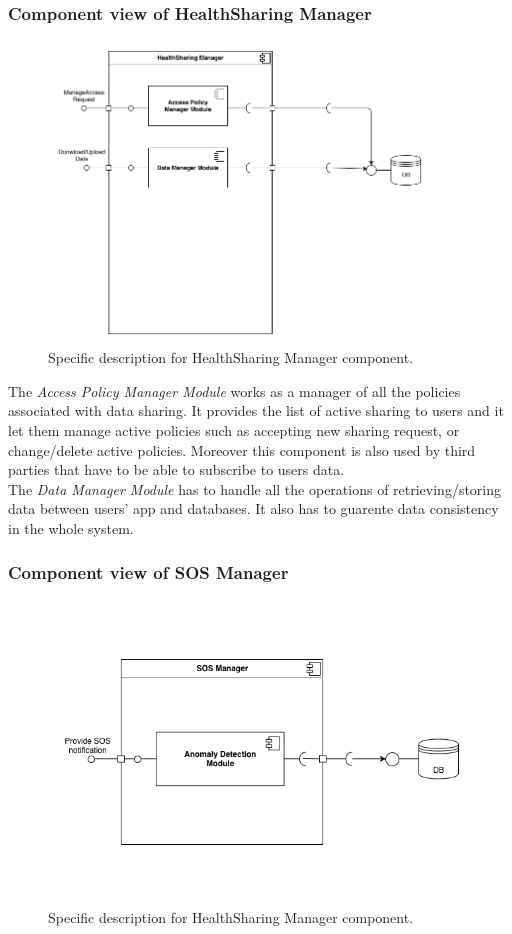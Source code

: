 \documentclass[DD.tex]{subfiles}
\begin{document}
\subsubsection{Component view of HealthSharing Manager}
\begin{figure}[h]
	\centering
	\includegraphics[height=8.00cm,keepaspectratio]{Figures/HealthSharingManagerComponent}
	\caption{Specific description for HealthSharing Manager component.}
\end{figure}

The \textit{Access Policy Manager Module} works as a manager of all the policies associated with data sharing. It provides the list of active sharing to users and it let them manage active policies such as accepting new sharing request, or change/delete active policies. Moreover this component is also used by third parties that have to be able to subscribe to users data.\\
The \textit{Data Manager Module} has to handle all the operations of retrieving/storing data between users' app and databases. It also has to guarente data consistency in the whole system.
\newpage
\subsubsection{Component view of SOS Manager}
\begin{figure}[h]
	\centering
	\includegraphics[height=8.00cm,keepaspectratio]{Figures/SOSManagerComponent}
	\caption{Specific description for HealthSharing Manager component.}
\end{figure}
\end{document}
